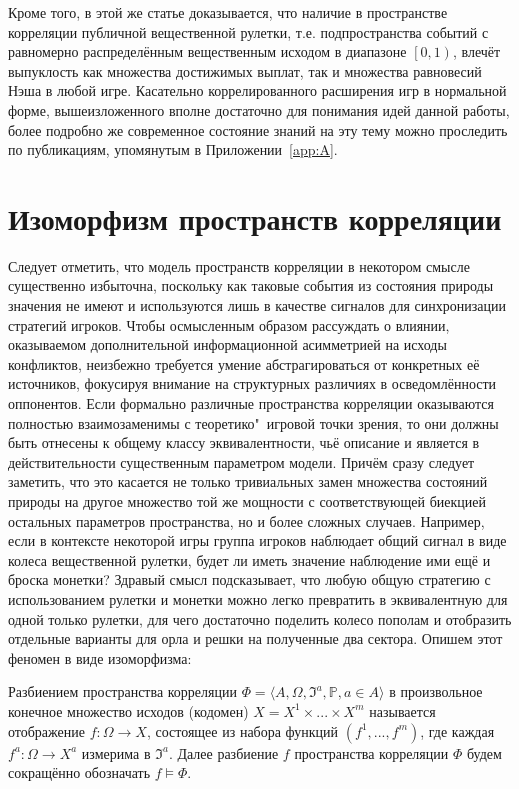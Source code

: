 Кроме того, в этой же статье доказывается, что наличие в пространстве корреляции публичной вещественной рулетки, т.е. подпространства событий с равномерно распределённым вещественным исходом в диапазоне $\left[0, 1\right)$, влечёт выпуклость как множества достижимых выплат, так и множества равновесий Нэша в любой игре. Касательно коррелированного расширения игр в нормальной форме, вышеизложенного вполне достаточно для понимания идей данной работы, более подробно же современное состояние знаний на эту тему можно проследить по публикациям, упомянутым в Приложении~\cref{app:A}.

\section{Изоморфизм пространств корреляции}\label{sec:ch1/sec2}

Следует отметить, что модель пространств корреляции в некотором смысле существенно избыточна, поскольку как таковые события из состояния природы значения не имеют и используются лишь в качестве сигналов для синхронизации стратегий игроков. Чтобы осмысленным образом рассуждать о влиянии, оказываемом дополнительной информационной асимметрией на исходы конфликтов, неизбежно требуется умение абстрагироваться от конкретных её источников, фокусируя внимание на структурных различиях в осведомлённости оппонентов. Если формально различные пространства корреляции оказываются полностью взаимозаменимы с теоретико"~игровой точки зрения, то они должны быть отнесены к общему классу эквивалентности, чьё описание и является в действительности существенным параметром модели. Причём сразу следует заметить, что это касается не только тривиальных замен множества состояний природы на другое множество той же мощности с соответствующей биекцией остальных параметров пространства, но и более сложных случаев. Например, если в контексте некоторой игры группа игроков наблюдает общий сигнал в виде колеса вещественной рулетки, будет ли иметь значение наблюдение ими ещё и броска монетки? Здравый смысл подсказывает, что любую общую стратегию с использованием рулетки и монетки можно легко превратить в эквивалентную для одной только рулетки, для чего достаточно поделить колесо пополам и отобразить отдельные варианты для орла и решки на полученные два сектора. Опишем этот феномен в виде изоморфизма:
\begin{definition}
	Разбиением пространства корреляции $\Phi = \langle A, \Omega, \mathfrak{I}^a, \mathbb{P}, a \in A \rangle$ в произвольное конечное множество исходов (кодомен) $X = X^1 \times ... \times X^m$ называется отображение $f : \Omega \rightarrow X$, состоящее из набора функций $(f^1, ..., f^m)$, где каждая $f^a : \Omega \rightarrow X^a$ измерима в $\mathfrak{I}^a$. Далее разбиение $f$ пространства корреляции $\Phi$ будем сокращённо обозначать $f \models \Phi$.
\end{definition}

